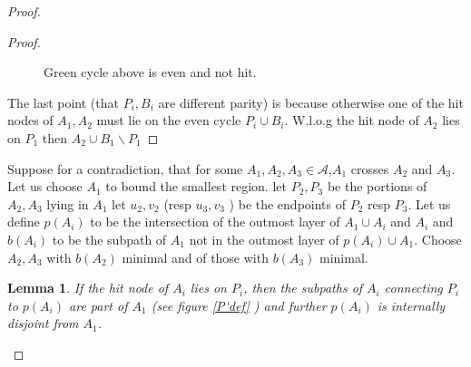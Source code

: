 \documentclass[letterpaper,11pt]{article}
\newtheorem{lemma}[theorem]{Lemma}
\newcommand{\0}{\mathbb{0}}
\newcommand{\1}{\mathbb{1}}
\begin{document}
\begin{proof}
\begin{proof}
\begin{figure}[h]
    \caption{Green cycle above is even and not hit.}
    \label{doublecrosscontradicrtion2}
\end{figure}

The last point (that $P_i , B_i$ are different parity) is because otherwise one of the hit nodes of $A_1, A_2$ must lie on the even cycle $P_i \cup B_i$.  W.l.o.g  the hit node of $A_2$ lies on $P_1$ then $A_2 \cup B_1 \backslash P_1$

\end{proof}

 Suppose for a contradiction, that for some $A_1, A_2 ,A_3 \in \mathcal{A}$,$A_1$ crosses $A_2 $ and $A_3$. Let us choose $A_1$ to bound the smallest region. let $P_2 , P_3$ be the portions of $A_2, A_3$ lying in $A_1$ let $u_2, v_2$ (resp    $u_3, v_3$ ) be the endpoints of $P_2$ resp $P_3$. 
 Let us define $p(A_i)$ to be the intersection of the outmost layer of $A_1 \cup A_i$ and $A_i$ and $b(A_i)$ to be the subpath of $A_1$ not in the outmost layer of $ p(A_i)  \cup A_1$. Choose $A_2 , A_3 $ with $b(A_2) $ minimal and of those with $b(A_3)$ minimal.

\begin{lemma}
If the hit node of $A_i$ lies on $P_i$, then the subpaths of $A_i$ connecting $P_i$ to $p(A_i)$ are part of $A_1$ (see figure \ref{P'def} ) and further $p(A_i)$ is internally disjoint from $A_1$.  
\end{lemma} 


\end{proof}
\end{document}
